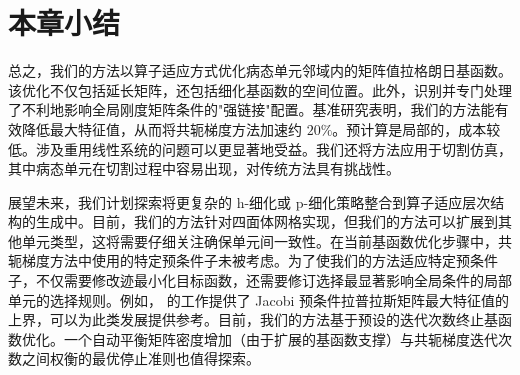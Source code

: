 \section{本章小结}

总之，我们的方法以算子适应方式优化病态单元邻域内的矩阵值拉格朗日基函数。该优化不仅包括延长矩阵，还包括细化基函数的空间位置。此外，识别并专门处理了不利地影响全局刚度矩阵条件的"强链接"配置。基准研究表明，我们的方法能有效降低最大特征值，从而将共轭梯度方法加速约 $20\%$。预计算是局部的，成本较低。涉及重用线性系统的问题可以更显著地受益。我们还将方法应用于切割仿真，其中病态单元在切割过程中容易出现，对传统方法具有挑战性。

展望未来，我们计划探索将更复杂的 h-细化或 p-细化策略整合到算子适应层次结构的生成中。目前，我们的方法针对四面体网格实现，但我们的方法可以扩展到其他单元类型，这将需要仔细关注确保单元间一致性。在当前基函数优化步骤中，共轭梯度方法中使用的特定预条件子未被考虑。为了使我们的方法适应特定预条件子，不仅需要修改迹最小化目标函数，还需要修订选择最显著影响全局条件的局部单元的选择规则。例如，\cite{Shewchuk2007Anisotropic} 的工作提供了 Jacobi 预条件拉普拉斯矩阵最大特征值的上界，可以为此类发展提供参考。目前，我们的方法基于预设的迭代次数终止基函数优化。一个自动平衡矩阵密度增加（由于扩展的基函数支撑）与共轭梯度迭代次数之间权衡的最优停止准则也值得探索。
